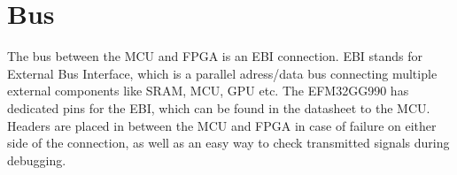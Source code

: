 \documentclass[../main/report.tex]{subfiles}
\begin{document}
\section{Bus}
The bus between the MCU and FPGA is an EBI connection.
EBI stands for External Bus Interface, which is a parallel adress/data bus connecting multiple external components like SRAM, MCU, GPU etc.
The EFM32GG990 has dedicated pins for the EBI, which can be found in the datasheet \cite{EFM32-datasheet} to the MCU.
Headers are placed in between the MCU and FPGA in case of failure on either side of the connection, as well as an easy way to check transmitted signals during debugging.
\end{document}
